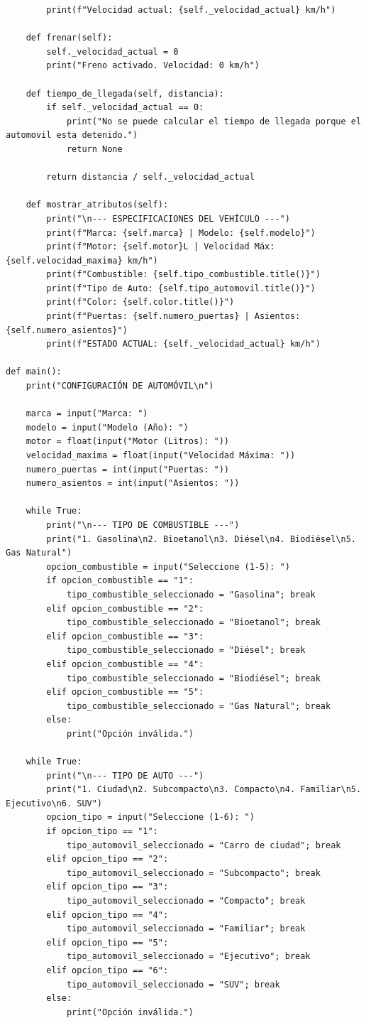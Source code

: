 \documentclass[11pt, a4paper]{article}
\begin{document}
\begin{lstlisting}
        print(f"Velocidad actual: {self._velocidad_actual} km/h")

    def frenar(self):
        self._velocidad_actual = 0
        print("Freno activado. Velocidad: 0 km/h")

    def tiempo_de_llegada(self, distancia):
        if self._velocidad_actual == 0:
            print("No se puede calcular el tiempo de llegada porque el automovil esta detenido.")
            return None

        return distancia / self._velocidad_actual

    def mostrar_atributos(self):
        print("\n--- ESPECIFICACIONES DEL VEHÍCULO ---")
        print(f"Marca: {self.marca} | Modelo: {self.modelo}")
        print(f"Motor: {self.motor}L | Velocidad Máx: {self.velocidad_maxima} km/h")
        print(f"Combustible: {self.tipo_combustible.title()}")
        print(f"Tipo de Auto: {self.tipo_automovil.title()}")
        print(f"Color: {self.color.title()}")
        print(f"Puertas: {self.numero_puertas} | Asientos: {self.numero_asientos}")
        print(f"ESTADO ACTUAL: {self._velocidad_actual} km/h")

def main():
    print("CONFIGURACIÓN DE AUTOMÓVIL\n")

    marca = input("Marca: ")
    modelo = input("Modelo (Año): ")
    motor = float(input("Motor (Litros): "))
    velocidad_maxima = float(input("Velocidad Máxima: "))
    numero_puertas = int(input("Puertas: "))
    numero_asientos = int(input("Asientos: "))

    while True:
        print("\n--- TIPO DE COMBUSTIBLE ---")
        print("1. Gasolina\n2. Bioetanol\n3. Diésel\n4. Biodiésel\n5. Gas Natural")
        opcion_combustible = input("Seleccione (1-5): ")
        if opcion_combustible == "1":
            tipo_combustible_seleccionado = "Gasolina"; break
        elif opcion_combustible == "2":
            tipo_combustible_seleccionado = "Bioetanol"; break
        elif opcion_combustible == "3":
            tipo_combustible_seleccionado = "Diésel"; break
        elif opcion_combustible == "4":
            tipo_combustible_seleccionado = "Biodiésel"; break
        elif opcion_combustible == "5":
            tipo_combustible_seleccionado = "Gas Natural"; break
        else:
            print("Opción inválida.")

    while True:
        print("\n--- TIPO DE AUTO ---")
        print("1. Ciudad\n2. Subcompacto\n3. Compacto\n4. Familiar\n5. Ejecutivo\n6. SUV")
        opcion_tipo = input("Seleccione (1-6): ")
        if opcion_tipo == "1":
            tipo_automovil_seleccionado = "Carro de ciudad"; break
        elif opcion_tipo == "2":
            tipo_automovil_seleccionado = "Subcompacto"; break
        elif opcion_tipo == "3":
            tipo_automovil_seleccionado = "Compacto"; break
        elif opcion_tipo == "4":
            tipo_automovil_seleccionado = "Familiar"; break
        elif opcion_tipo == "5":
            tipo_automovil_seleccionado = "Ejecutivo"; break
        elif opcion_tipo == "6":
            tipo_automovil_seleccionado = "SUV"; break
        else:
            print("Opción inválida.")


\end{lstlisting}
\end{document}
